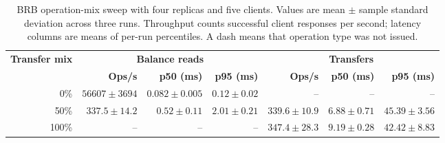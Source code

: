 \documentclass[sigconf,a4paper]{acmart}
\begin{document}
    \begin{table}[t]
        \centering
        \scriptsize
        \caption{BRB operation-mix sweep with four replicas and five clients.
        Values are mean $\pm$ sample standard deviation across three runs. Throughput
        counts successful client responses per second; latency columns are means
        of per-run percentiles. A dash means that operation type was not issued.}
        \label{tab:brb-mix}
        \begin{tabular}{r r r r r r r}
            \toprule
            \textbf{Transfer mix} & \multicolumn{3}{c}{\textbf{Balance reads}} &
            \multicolumn{3}{c}{\textbf{Transfers}} \\
            \cmidrule(lr){2-4}\cmidrule(lr){5-7}
            & \textbf{Ops/s} & \textbf{p50 (ms)} & \textbf{p95 (ms)} &
            \textbf{Ops/s} & \textbf{p50 (ms)} & \textbf{p95 (ms)} \\
            \midrule
            0\% & $56607\pm3694$ & $0.082\pm0.005$ & $0.12\pm0.02$ & -- & -- & -- \\
            50\% & $337.5\pm14.2$ & $0.52\pm0.11$ & $2.01\pm0.21$ &
            $339.6\pm10.9$ & $6.88\pm0.71$ & $45.39\pm3.56$ \\
            100\% & -- & -- & -- & $347.4\pm28.3$ & $9.19\pm0.28$ & $42.42\pm8.83$ \\
            \bottomrule
        \end{tabular}
    \end{table}
\end{document}
